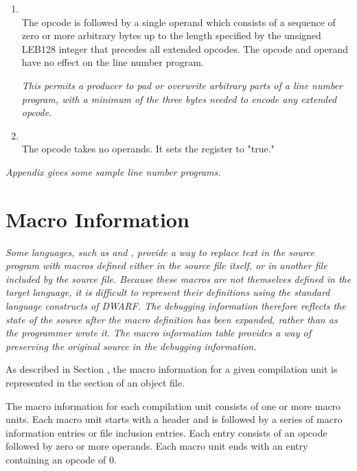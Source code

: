 \begin{enumerate}[1. ]
\bb
\item \textbf{\DWLNEpaddingTARG} \\
The \DWLNEpaddingNAME{} opcode is followed by a single
operand which consists of a sequence of zero or more 
arbitrary bytes up to the length specified by the unsigned 
LEB128 integer that precedes all 
extended opcodes.  The opcode and operand have no
effect on the line number program.

\textit{This permits a producer to pad or overwrite arbitrary
parts of a line number program, with a minimum of the
three bytes needed to encode any extended opcode.}
\eb

\bb
\item \textbf{\DWLNEsetprologueepilogueTARG} \\
The \DWLNEsetprologueepilogueNAME{} opcode takes no operands. 
It sets the  register to "true."
\eb

\end{enumerate}
\db
\textit{Appendix  
gives some sample line number programs.}

\section{Macro Information}
\label{chap:macroinformation}
\textit{Some languages, such as \C{} and \Cplusplus{}, 
provide a way to replace
text in the source program with macros defined either in the
source file itself, or in another file included by the source
file.  Because these macros are not themselves defined in the
target language, it is difficult to represent their definitions
using the standard language constructs of DWARF. The debugging
information therefore reflects the state of the source after
the macro definition has been expanded, rather than as the
programmer wrote it. The macro information table provides a way
of preserving the original source in the debugging information.}

As described in 
Section ,
the macro information for a
given compilation unit is represented in the 
\dotdebugmacro{}
section of an object file. 
\db

The macro information for each compilation unit consists of one or
more macro units.  Each macro unit starts with a header
and is followed by a series of macro information entries or file
inclusion entries.  Each entry consists of an opcode followed by
zero or more operands. Each macro unit ends with an entry
containing an opcode of 0.


